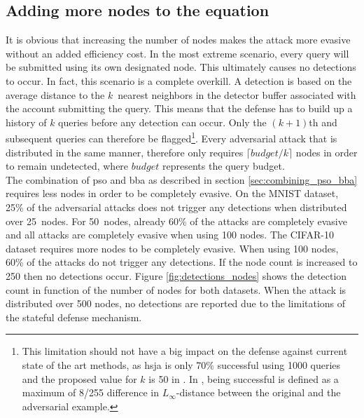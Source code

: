 \subsection{Adding more nodes to the equation}\label{sec:more_nodes}
It is obvious that increasing the number of nodes makes the attack more evasive without an added efficiency cost. In the most extreme scenario, every query will be submitted using its own designated node. This ultimately causes no detections to occur. In fact, this scenario is a complete overkill. A detection is based on the average distance to the $k$~nearest neighbors in the detector buffer associated with the account submitting the query. This means that the defense has to build up a history of $k$ queries before any detection can occur. Only the $(k+1)$th and subsequent queries can therefore be flagged\footnote{This limitation should not have a big impact on the defense against current state of the art methods, as \gls{hsja} is only 70\% successful using \num{1000} queries \cite{hsja} and the proposed value for $k$ is 50 in \cite{chen_stateful_2019}. In \cite{chen_stateful_2019}, being successful is defined as a maximum of 8/255 difference in $L_\infty$-distance between the original and the adversarial example.}. Every adversarial attack that is distributed in the same manner, therefore only requires $\lceil budget / k \rceil$ nodes in order to remain undetected, where $budget$ represents the query budget.\\

The combination of \gls{pso} and \gls{bba} as described in section \ref{sec:combining_pso_bba} requires less nodes in order to be completely evasive. On the MNIST dataset, 25\% of the adversarial attacks does not trigger any detections when distributed over 25~nodes. For 50~nodes, already 60\% of the attacks are completely evasive and all attacks are completely evasive when using 100 nodes. The CIFAR-10 dataset requires more nodes to be completely evasive. When using 100 nodes, 60\% of the attacks do not trigger any detections. If the node count is increased to 250 then no detections occur. Figure \ref{fig:detections_nodes} shows the detection count in function of the number of nodes for both datasets. When the attack is distributed over 500 nodes, no detections are reported due to the limitations of the stateful defense mechanism.

